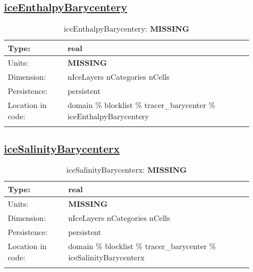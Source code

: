 \subsection[iceEnthalpyBarycentery]{\hyperref[sec:var_tab_tracer_barycenter]{iceEnthalpyBarycentery}}
\label{subsec:var_sec_tracer_barycenter_iceEnthalpyBarycentery}
\begin{center}
\begin{longtable}{| p{2.0in} | p{4.0in} |}
        \hline 
        Type: & real \\
        \hline 
        Units: & {\bf \color{red} MISSING} \\
        \hline 
        Dimension: & nIceLayers nCategories nCells \\
        \hline 
        Persistence: & persistent \\
        \hline 
         Location in code: & domain \% blocklist \% tracer\_barycenter \% iceEnthalpyBarycentery \\
         \hline 
    \caption{iceEnthalpyBarycentery: {\bf \color{red} MISSING}}
\end{longtable}
\end{center}
\subsection[iceSalinityBarycenterx]{\hyperref[sec:var_tab_tracer_barycenter]{iceSalinityBarycenterx}}
\label{subsec:var_sec_tracer_barycenter_iceSalinityBarycenterx}
\begin{center}
\begin{longtable}{| p{2.0in} | p{4.0in} |}
        \hline 
        Type: & real \\
        \hline 
        Units: & {\bf \color{red} MISSING} \\
        \hline 
        Dimension: & nIceLayers nCategories nCells \\
        \hline 
        Persistence: & persistent \\
        \hline 
         Location in code: & domain \% blocklist \% tracer\_barycenter \% iceSalinityBarycenterx \\
         \hline 
    \caption{iceSalinityBarycenterx: {\bf \color{red} MISSING}}
\end{longtable}
\end{center}
